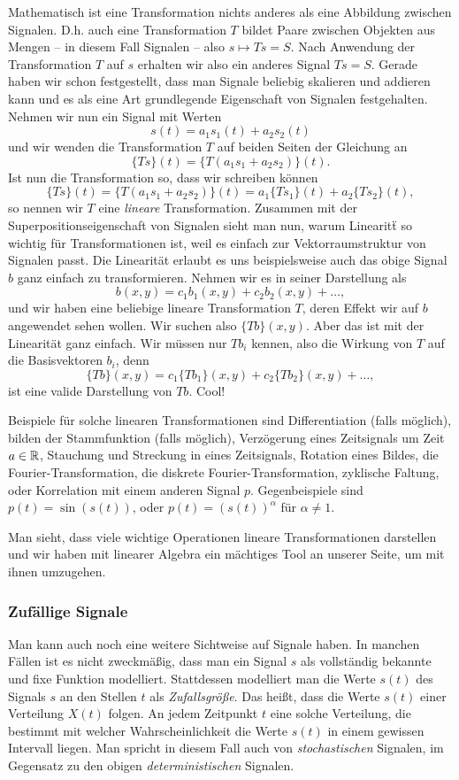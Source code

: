 Mathematisch ist eine Transformation nichts anderes als eine Abbildung zwischen Signalen.
D.h. auch eine Transformation $T$ bildet Paare zwischen Objekten aus Mengen -- in diesem Fall Signalen -- also $s \mapsto Ts = S$.
Nach Anwendung der Transformation $T$ auf $s$ erhalten wir also ein anderes Signal $Ts = S$.
Gerade haben wir schon festgestellt, dass man Signale beliebig skalieren und addieren kann und es als eine Art grundlegende Eigenschaft von Signalen festgehalten.
Nehmen wir nun ein Signal mit Werten
\[
    s(t) = a_1 s_1(t) + a_2 s_2(t)
\] 
und wir wenden die Transformation $T$ auf beiden Seiten der Gleichung an
\[
    \{Ts\}(t) = \{T (a_1 s_1 + a_2 s_2)\}(t).
\]
Ist nun die Transformation so, dass wir schreiben k\"onnen
\[
    \{Ts\}(t) = \{T (a_1 s_1 + a_2 s_2)\}(t) = a_1 \{Ts_1\}(t) + a_2 \{Ts_2\}(t),
\]
so nennen wir $T$ eine \emph{lineare} Transformation.
Zusammen mit der Superpositionseigenschaft von Signalen sieht man nun, warum Linearit\"t so wichtig f\"ur Transformationen ist, weil es einfach zur Vektorraumstruktur von Signalen passt.
Die Linearit\"at erlaubt es uns beispielsweise auch das obige Signal $b$ ganz einfach zu transformieren.
Nehmen wir es in seiner Darstellung als
\[
    b(x,y) = c_1 b_1(x,y) + c_2 b_2(x,y) + \dots,
\]
und wir haben eine beliebige lineare Transformation $T$, deren Effekt wir auf $b$ angewendet sehen wollen. 
Wir suchen also $\{Tb\}(x,y)$.
Aber das ist mit der Linearit\"at ganz einfach. Wir m\"ussen nur $Tb_i$ kennen, also die Wirkung von $T$ auf die Basisvektoren $b_i$, denn
\[
    \{Tb\}(x,y) = c_1 \{Tb_1\}(x,y) + c_2 \{Tb_2\}(x,y) + \dots,
\]
ist eine valide Darstellung von $Tb$.
Cool!

Beispiele f\"ur solche linearen Transformationen sind Differentiation (falls m\"oglich), bilden der Stammfunktion (falls m\"oglich), Verz\"ogerung eines Zeitsignals um Zeit $a \in \mathbb{R}$, Stauchung und Streckung in eines Zeitsignals, Rotation eines Bildes, die Fourier-Transformation, die diskrete Fourier-Transformation, zyklische Faltung, oder Korrelation mit einem anderen Signal $p$.
Gegenbeispiele sind $p(t) = \sin(s(t))$, oder $p(t) = (s(t))^\alpha$ f\"ur $\alpha \neq 1$.

Man sieht, dass viele wichtige Operationen lineare Transformationen darstellen und wir haben mit linearer Algebra ein m\"achtiges Tool an unserer Seite, um mit ihnen umzugehen.
%
%
\subsubsection{Zuf\"allige Signale}
%
Man kann auch noch eine weitere Sichtweise auf Signale haben. In manchen F\"allen ist es nicht zweckm\"a\ss{}ig, dass man ein Signal $s$ als vollst\"andig bekannte und fixe Funktion modelliert.
Stattdessen modelliert man die Werte $s(t)$ des Signals $s$ an den Stellen $t$ als \emph{Zufallsgr\"o\ss{}e}.
Das hei\ss{}t, dass die Werte $s(t)$ einer Verteilung $X(t)$ folgen. 
An jedem Zeitpunkt $t$  eine solche Verteilung, die bestimmt mit welcher Wahrscheinlichkeit die Werte $s(t)$ in einem gewissen Intervall liegen.
Man spricht in diesem Fall auch von \emph{stochastischen} Signalen, im Gegensatz zu den obigen \emph{deterministischen} Signalen.

